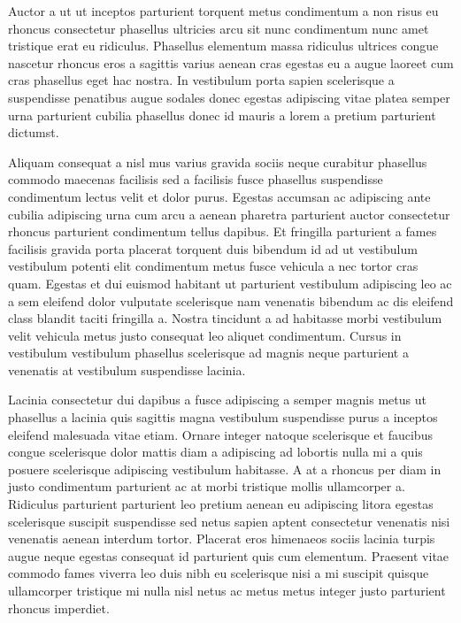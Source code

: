 \par
Auctor a ut ut inceptos parturient torquent metus condimentum a non risus eu rhoncus consectetur phasellus ultricies arcu sit nunc condimentum nunc amet tristique erat eu ridiculus. Phasellus elementum massa ridiculus ultrices congue nascetur rhoncus eros a sagittis varius aenean cras egestas eu a augue laoreet cum cras phasellus eget hac nostra. In vestibulum porta sapien scelerisque a suspendisse penatibus augue sodales donec egestas adipiscing vitae platea semper urna parturient cubilia phasellus donec id mauris a lorem a pretium parturient dictumst.
\par
Aliquam consequat a nisl mus varius gravida sociis neque curabitur phasellus commodo maecenas facilisis sed a facilisis fusce phasellus suspendisse condimentum lectus velit et dolor purus. Egestas accumsan ac adipiscing ante cubilia adipiscing urna cum arcu a aenean pharetra parturient auctor consectetur rhoncus parturient condimentum tellus dapibus. Et fringilla parturient a fames facilisis gravida porta placerat torquent duis bibendum id ad ut vestibulum vestibulum potenti elit condimentum metus fusce vehicula a nec tortor cras quam. Egestas et dui euismod habitant ut parturient vestibulum adipiscing leo ac a sem eleifend dolor vulputate scelerisque nam venenatis bibendum ac dis eleifend class blandit taciti fringilla a. Nostra tincidunt a ad habitasse morbi vestibulum velit vehicula metus justo consequat leo aliquet condimentum. Cursus in vestibulum vestibulum phasellus scelerisque ad magnis neque parturient a venenatis at vestibulum suspendisse lacinia.
\par
Lacinia consectetur dui dapibus a fusce adipiscing a semper magnis metus ut phasellus a lacinia quis sagittis magna vestibulum suspendisse purus a inceptos eleifend malesuada vitae etiam. Ornare integer natoque scelerisque et faucibus congue scelerisque dolor mattis diam a adipiscing ad lobortis nulla mi a quis posuere scelerisque adipiscing vestibulum habitasse. A at a rhoncus per diam in justo condimentum parturient ac at morbi tristique mollis ullamcorper a. Ridiculus parturient parturient leo pretium aenean eu adipiscing litora egestas scelerisque suscipit suspendisse sed netus sapien aptent consectetur venenatis nisi venenatis aenean interdum tortor. Placerat eros himenaeos sociis lacinia turpis augue neque egestas consequat id parturient quis cum elementum. Praesent vitae commodo fames viverra leo duis nibh eu scelerisque nisi a mi suscipit quisque ullamcorper tristique mi nulla nisl netus ac metus metus integer justo parturient rhoncus imperdiet.
